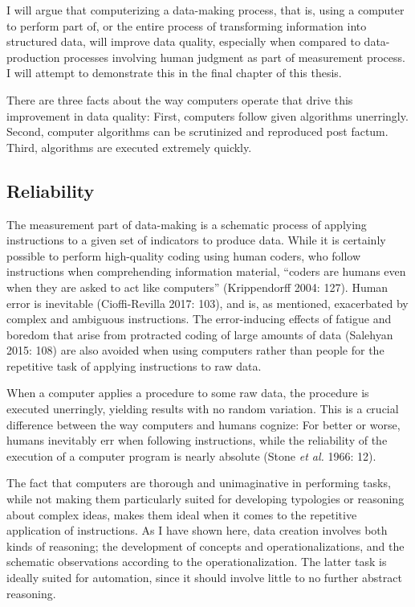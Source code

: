 \documentclass[12pt,twoside]{reedthesis}
\begin{document}
I will argue that computerizing a data-making process, that is, using a
computer to perform part of, or the entire process of transforming
information into structured data, will improve data quality, especially
when compared to data-production processes involving human judgment as
part of measurement process. I will attempt to demonstrate this in the
final chapter of this thesis.

There are three facts about the way computers operate that drive this
improvement in data quality: First, computers follow given algorithms
unerringly. Second, computer algorithms can be scrutinized and
reproduced post factum. Third, algorithms are executed extremely
quickly.

\subsection{Reliability}\label{reliability-1}

The measurement part of data-making is a schematic process of applying
instructions to a given set of indicators to produce data. While it is
certainly possible to perform high-quality coding using human coders,
who follow instructions when comprehending information material,
``coders are humans even when they are asked to act like computers''
(Krippendorff 2004: 127). Human error is inevitable (Cioffi-Revilla
2017: 103), and is, as mentioned, exacerbated by complex and ambiguous
instructions. The error-inducing effects of fatigue and boredom that
arise from protracted coding of large amounts of data (Salehyan 2015:
108) are also avoided when using computers rather than people for the
repetitive task of applying instructions to raw data.

When a computer applies a procedure to some raw data, the procedure is
executed unerringly, yielding results with no random variation. This is
a crucial difference between the way computers and humans cognize: For
better or worse, humans inevitably err when following instructions,
while the reliability of the execution of a computer program is nearly
absolute (Stone \emph{et al.} 1966: 12).

The fact that computers are thorough and unimaginative in performing
tasks, while not making them particularly suited for developing
typologies or reasoning about complex ideas, makes them ideal when it
comes to the repetitive application of instructions. As I have shown
here, data creation involves both kinds of reasoning; the development of
concepts and operationalizations, and the schematic observations
according to the operationalization. The latter task is ideally suited
for automation, since it should involve little to no further abstract
reasoning.
\end{document}
